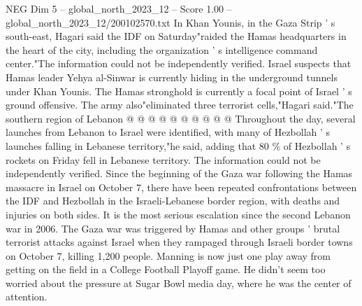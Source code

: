 \begin{textsample}{NEG Dim 5 – global\_north\_2023\_12 – Score 1.00 – global\_north\_2023\_12/200102570.txt}
In Khan Younis, in the Gaza Strip ' s south-east, Hagari said the IDF on Saturday"raided the Hamas headquarters in the heart of the city, including the organization ' s intelligence command center."The information could not be independently verified.
Israel suspects that Hamas leader Yehya al-Sinwar is currently hiding in the underground tunnels under Khan Younis.
The Hamas stronghold is currently a focal point of Israel ' s ground offensive.
The army also"eliminated three terrorist cells,"Hagari said."The southern region of Lebanon @ @ @ @ @ @ @ @ @ @ Throughout the day, several launches from Lebanon to Israel were identified, with many of Hezbollah ' s launches falling in Lebanese territory,"he said, adding that 80 \% of Hezbollah ' s rockets on Friday fell in Lebanese territory.
The information could not be independently verified.
Since the beginning of the Gaza war following the Hamas massacre in Israel on October 7, there have been repeated confrontations between the IDF and Hezbollah in the Israeli-Lebanese border region, with deaths and injuries on both sides.
It is the most serious escalation since the second Lebanon war in 2006.
The Gaza war was triggered by Hamas and other groups ' brutal terrorist attacks against Israel when they rampaged through Israeli border towns on October 7, killing 1,200 people.
Manning is now just one play away from getting on the field in a College Football Playoff game.
He didn't seem too worried about the pressure at Sugar Bowl media day, where he was the center of attention.

\end{textsample}
